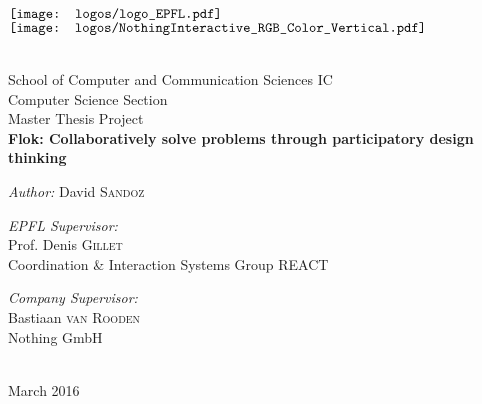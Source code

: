 
\begin{titlepage}

\begin{center}

\begin{minipage}{6in}
  \centering
  $\vcenter{\hbox{\texttt{[image: logos/logo\_EPFL.pdf]}}}$
  \hspace*{2cm}
  $\vcenter{\hbox{\texttt{[image: logos/NothingInteractive\_RGB\_Color\_Vertical.pdf]}}}$
\end{minipage}\\[2 cm]

{\large School of Computer and Communication Sciences IC}\\[0.5cm]
{\large Computer Science Section}\\[0.5cm]
{\Large Master Thesis Project}\\[0.5cm]


\vspace{1cm}
{\huge \bfseries Flok: Collaboratively solve problems through participatory design thinking}\\[0.4cm]

\vspace{1.5cm}

\large \emph{Author:} David \textsc{Sandoz}\\[1.5cm]

\begin{minipage}{0.5\textwidth}
\begin{flushleft} \large
\emph{EPFL Supervisor:}\\
Prof. Denis \textsc{Gillet}\\
Coordination \& Interaction Systems Group REACT
\end{flushleft}
\end{minipage}
\begin{minipage}{0.4\textwidth}
\begin{flushright} \large
\emph{Company Supervisor:}\\
Bastiaan \textsc{van Rooden}\\
Nothing GmbH\\
~
\end{flushright}
\end{minipage}

\vfill

{\large March 2016}

\end{center}

\end{titlepage}

\pagecolor{white}
\color{black}
